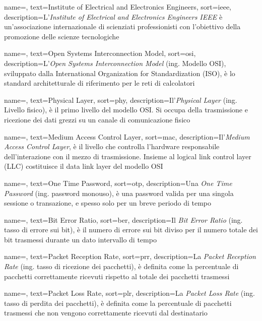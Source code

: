  {
    name=,
    text=Institute of Electrical and Electronics Engineers,
    sort=ieee,
    description={L'\emph{Institute of Electrical and Electronics Engineers IEEE} è un'associazione internazionale di scienziati professionisti con l'obiettivo della promozione delle scienze tecnologiche}
}

 {
    name=,
    text=Open Systems Interconnection Model,
    sort=osi,
    description={L'\emph{Open Systems Interconnection Model} (ing. Modello OSI), sviluppato dalla International Organization for Standardization (ISO), è lo standard architetturale di riferimento per le reti di calcolatori}
}

 {
    name=,
    text=Physical Layer,
    sort=phy,
    description={Il'\emph{Physical Layer} (ing. Livello fisico), è il primo livello del modello OSI. Si occupa della trasmissione e ricezione dei dati grezzi su un canale di comunicazione fisico}
}

 {
    name=,
    text=Medium Access Control Layer,
    sort=mac,
    description={Il'\emph{Medium Access Control Layer}, è il livello che controlla l'hardware responsabile dell'interazione con il mezzo di trasmissione. Insieme al logical link control layer (LLC) costituisce il data link layer del modello OSI}
}

 {
    name=,
    text=One Time Password,
    sort=otp,
    description={Una \emph{One Time Password} (ing. password monouso), è una password valida per una singola sessione o transazione, e spesso solo per un breve periodo di tempo} 
}

 {
    name=,
    text=Bit Error Ratio,
    sort=ber,
    description={Il \emph{Bit Error Ratio} (ing. tasso di errore sui bit), è il numero di errore sui bit diviso per il numero totale dei bit trasmessi durante un dato intervallo di tempo}
}

 {
    name=,
    text=Packet Reception Rate,
    sort=prr,
    description={La \emph{Packet Reception Rate} (ing. tasso di ricezione dei pacchetti), è definita come la percentuale di pacchetti correttamente ricevuti rispetto al totale dei pacchetti trasmessi}
}

 {
    name=,
    text=Packet Loss Rate,
    sort=plr,
    description={La \emph{Packet Loss Rate} (ing. tasso di perdita dei pacchetti), è definita come la percentuale di pacchetti trasmessi che non vengono correttamente ricevuti dal destinatario}
}